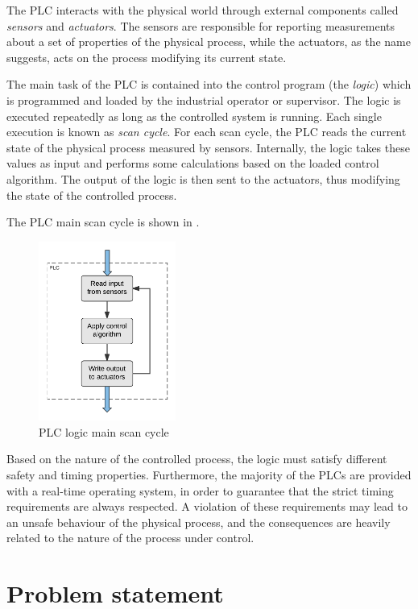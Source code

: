 The PLC interacts with the physical world through external components called \emph{sensors} and \emph{actuators}.
The sensors are responsible for reporting measurements about a set of properties of the physical process,
while the actuators, as the name suggests, acts on the process modifying its current state.

The main task of the PLC is contained into the control program (the \emph{logic}) which is programmed and loaded by the industrial operator or supervisor.
The logic is executed repeatedly as long as the controlled system is running. Each single execution is known as \emph{scan cycle}.
For each scan cycle, the PLC reads the current state of the physical process measured by sensors.
Internally, the logic takes these values as input and performs some calculations based on the loaded control algorithm.
The output of the logic is then sent to the actuators, thus modifying the state of the controlled process.

The PLC main scan cycle is shown in .
\begin{figure}[h]
\centerline{\includegraphics[width=0.4\textwidth]{res/scan_cycle}}
\caption{PLC logic main scan cycle\label{fig:scan_cycle}}
\end{figure}

Based on the nature of the controlled process, the logic must satisfy different safety and timing properties.
Furthermore, the majority of the PLCs are provided with a real-time operating system, in order to guarantee that the strict timing requirements are always respected.
A violation of these requirements may lead to an unsafe behaviour of the physical process, and the consequences are heavily related to the nature of the process under control.


\section{Problem statement}

